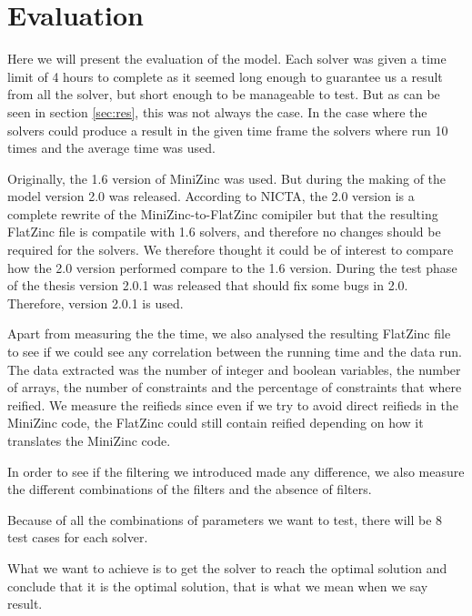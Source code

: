 \chapter{Evaluation}\label{cha:eval}
Here we will present the evaluation of the model. Each solver was given a time limit of 4 hours to complete as it seemed long enough to guarantee us a result from all the solver, but short enough to be manageable to test. But as can be seen in section \ref{sec:res}, this was not always the case. In the case where the solvers could produce a result in the given time frame the solvers where run 10 times and the average time was used.

Originally, the 1.6 version of MiniZinc was used. But during the making of the model version 2.0 was released. According to NICTA, the 2.0 version is a complete rewrite of the MiniZinc-to-FlatZinc comipiler but that the resulting FlatZinc file is compatile with 1.6 solvers, and therefore no changes should be required for the solvers.\cite{mz2} We therefore thought it could be of interest to compare how the 2.0 version performed compare to the 1.6 version. During the test phase of the thesis version 2.0.1 was released that should fix some bugs in 2.0.\cite{mz2_changelog} Therefore, version 2.0.1 is used.

Apart from measuring the the time, we also analysed the resulting FlatZinc file to see if we could see any correlation between the running time and the data run. The data extracted was the number of integer and boolean variables, the number of arrays, the number of constraints and the percentage of constraints that where reified. We measure the reifieds since even if we try to avoid direct reifieds in the MiniZinc code, the FlatZinc could still contain reified depending on how it translates the MiniZinc code.

In order to see if the filtering we introduced made any difference, we also measure the different combinations of the filters and the absence of filters.

Because of all the combinations of parameters we want to test, there will be 8 test cases for each solver.

What we want to achieve is to get the solver to reach the optimal solution and conclude that it is the optimal solution, that is what we mean when we say result.

